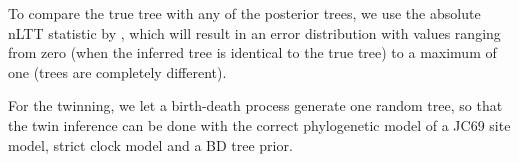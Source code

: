 To compare the true tree with any of the posterior trees, we use the absolute nLTT statistic by \citet{janzen2015}, which will result in an error distribution with values ranging from zero (when the inferred tree is identical to the true tree) to a maximum of one (trees are completely different).

For the twinning, we let a birth-death process generate one random tree,
so that the twin inference can be done with the correct phylogenetic
model of a JC69 site model, strict clock model and a BD tree prior.

